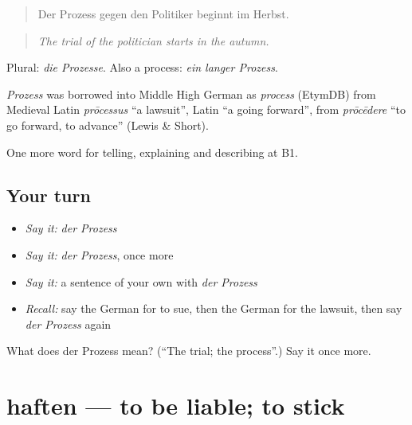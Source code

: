 \begin{quote}
Der Prozess gegen den Politiker beginnt im Herbst.
\end{quote}

\begin{quote}
\emph{The trial of the politician starts in the autumn.}
\end{quote}

Plural: \emph{die Prozesse}. Also a process: \emph{ein langer Prozess}.

\begin{cousinweb}
\emph{Prozess} was borrowed into Middle High German as \emph{process} (EtymDB) from Medieval Latin \emph{prōcessus} \textquotedblleft{}a lawsuit\textquotedblright{}, Latin \textquotedblleft{}a going forward\textquotedblright{}, from \emph{prōcēdere} \textquotedblleft{}to go forward, to advance\textquotedblright{} (Lewis \& Short).
\end{cousinweb}

\begin{grammarlens}[title={What you've built}]
One more word for telling, explaining and describing at B1.
\end{grammarlens}

\subsection*{Your turn}
\begin{itemize}
\raggedright
  \item \emph{Say it:} \emph{der Prozess}
  \item \emph{Say it:} \emph{der Prozess}, once more
  \item \emph{Say it:} a sentence of your own with \emph{der Prozess}
  \item \emph{Recall:} say the German for to sue, then the German for the lawsuit, then say \emph{der Prozess} again
\end{itemize}

\begin{tcolorbox}[breakable,colback=teal!4,colframe=teal!35!black,title={Before you move on}]
What does der Prozess mean? (\textquotedblleft{}The trial; the process\textquotedblright{}.) Say it once more.
\end{tcolorbox}
\section[haften]{haften — to be liable; to stick}

\label{lesson:GE-C386-haften}



